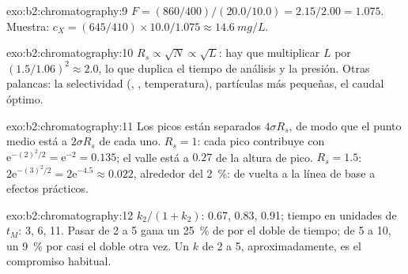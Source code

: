 \begin{solution}{exo:b2:chromatography:9}
$F = (860/400)/(20.0/10.0) = 2.15/2.00 = 1.075$. Muestra: $c_X = (645/410) \times 10.0/1.075 \approx
\qty{14.6}{mg/L}$.
\end{solution}

\begin{solution}{exo:b2:chromatography:10}
$R_s \propto \sqrt N \propto \sqrt L$: hay que multiplicar $L$ por $(1.5/1.06)^2 \approx 2.0$, lo que duplica
el tiempo de análisis y la presión. Otras palancas: la selectividad (, ,
temperatura), partículas más pequeñas, el caudal óptimo.
\end{solution}

\begin{solution}{exo:b2:chromatography:11}
Los picos están separados $4\sigma R_s$, de modo que el punto medio está a $2\sigma R_s$ de cada uno. $R_s = 1$: cada pico
contribuye con $\mathrm e^{-(2)^2/2} = \mathrm e^{-2} = 0.135$; el valle está a $0.27$ de la altura de pico.
$R_s = 1.5$: $2\mathrm e^{-(3)^2/2} = 2\mathrm e^{-4.5} \approx 0.022$, alrededor del 2~\%: de vuelta a la línea de base
a efectos prácticos.
\end{solution}

\begin{solution}{exo:b2:chromatography:12}
$k_2/(1+k_2)$: 0.67, 0.83, 0.91; tiempo en unidades de $t_M$: 3, 6, 11. Pasar de 2 a 5 gana un 25~\% de
 por el doble de tiempo; de 5 a 10, un 9~\% por casi el doble otra vez. Un $k$ de 2 a 5, aproximadamente, es
el compromiso habitual.
\end{solution}

